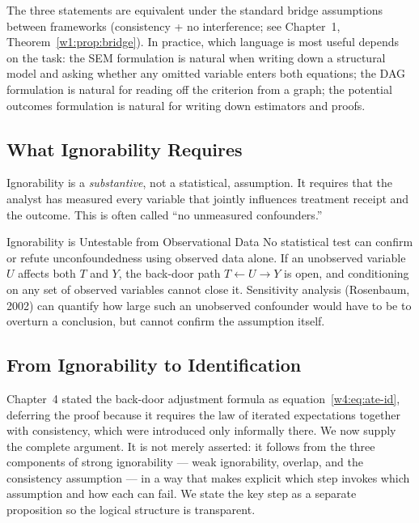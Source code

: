 \documentclass[master.tex]{subfiles}
\begin{document}
\noindent The three statements are equivalent under the standard
bridge assumptions between frameworks (consistency + no interference;
see Chapter~1, Theorem~\ref{w1:prop:bridge}).  In practice, which
language is most useful depends on the task: the SEM formulation is
natural when writing down a structural model and asking whether any
omitted variable enters both equations; the DAG formulation is natural
for reading off the criterion from a graph; the potential outcomes
formulation is natural for writing down estimators and proofs.

\subsection{What Ignorability Requires}

Ignorability is a \emph{substantive}, not a statistical, assumption.
It requires that the analyst has measured every variable that jointly
influences treatment receipt and the outcome.  This is often called
``no unmeasured confounders.''

\begin{warn}{Ignorability is Untestable from Observational Data}
No statistical test can confirm or refute unconfoundedness using
observed data alone.  If an unobserved variable $U$ affects both $T$
and $Y$, the back-door path $T \leftarrow U \rightarrow Y$ is open, and
conditioning on any set of observed variables cannot close it.
Sensitivity analysis (Rosenbaum, 2002) can quantify how large such an
unobserved confounder would have to be to overturn a conclusion, but
cannot confirm the assumption itself.
\end{warn}

\subsection{From Ignorability to Identification}
\label{w5:subsec:identification}

Chapter~4 stated the back-door adjustment formula as
equation~\eqref{w4:eq:ate-id},
deferring the proof because it requires the law of iterated expectations
together with consistency, which were introduced only informally there.
We now supply the complete argument.  It is not merely asserted: it
follows from the three components of strong ignorability --- weak
ignorability, overlap, and the consistency assumption --- in a way that
makes explicit which step invokes which assumption and how each can
fail.  We state the key step as a separate proposition so the logical
structure is transparent.
\end{document}
